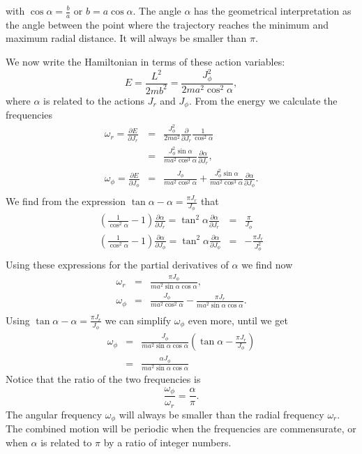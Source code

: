 \documentclass[letterpaper,11pt]{article}
\begin{document}
with $\cos\alpha = \frac{b}{a}$ or $b = a \cos\alpha$.  The angle $\alpha$ has the geometrical interpretation as the angle between the point where the trajectory reaches the minimum and maximum radial distance.  It will always be smaller than $\pi$.

We now write the Hamiltonian in terms of these action variables:
\begin{equation*}
 E = \frac{L^2}{2 m b^2} = \frac{J_\phi^2}{2 m a^2 \cos^2\alpha},
\end{equation*}
where $\alpha$ is related to the actions $J_r$ and $J_\phi$.  From the energy we calculate the frequencies
\begin{eqnarray*}
 \omega_r = \frac{\partial E}{\partial J_r} & = & \frac{J_\phi^2}{2 m a^2} \frac{\partial}{\partial J_r} \frac{1}{\cos^2\alpha} \\
 & = & \frac{J_\phi^2 \sin\alpha}{m a^2 \cos^3\alpha} \frac{\partial \alpha}{\partial J_r}, \\
 \omega_\phi = \frac{\partial E}{\partial J_\phi} & = & \frac{J_\phi}{m a^2 \cos^2\alpha} + \frac{J_\phi^2 \sin\alpha}{m a^2 \cos^3\alpha} \frac{\partial \alpha}{\partial J_\phi}. \\
\end{eqnarray*}
We find from the expression $\tan\alpha - \alpha = \frac{\pi J_r}{J_\phi}$ that
\begin{eqnarray*}
 \left( \frac{1}{\cos^2\alpha} - 1 \right) \frac{\partial \alpha}{\partial J_r} = \tan^2\alpha \frac{\partial \alpha}{\partial J_r} & = & \frac{\pi}{J_\phi} \\
 \left( \frac{1}{\cos^2\alpha} - 1 \right) \frac{\partial \alpha}{\partial J_\phi} = \tan^2\alpha \frac{\partial \alpha}{\partial J_\phi} & = & -\frac{\pi J_r}{J_\phi^2} \\
\end{eqnarray*}
Using these expressions for the partial derivatives of $\alpha$ we find now
\begin{eqnarray*}
 \omega_r & = & \frac{\pi J_\phi}{m a^2 \sin\alpha \cos\alpha}, \\
 \omega_\phi & = & \frac{J_\phi}{m a^2 \cos^2\alpha} - \frac{\pi J_r}{m a^2 \sin\alpha \cos\alpha}. \\
\end{eqnarray*}
Using $\tan\alpha - \alpha = \frac{\pi J_r}{J_\phi}$ we can simplify $\omega_\phi$ even more, until we get
\begin{eqnarray*}
 \omega_\phi & = & \frac{J_\phi}{m a^2 \sin\alpha \cos\alpha} \left( \tan\alpha - \frac{\pi J_r}{J_\phi} \right) \\
 & = & \frac{\alpha J_\phi}{m a^2 \sin\alpha \cos\alpha}
\end{eqnarray*}
Notice that the ratio of the two frequencies is
\begin{equation*}
 \frac{\omega_\phi}{\omega_r} = \frac{\alpha}{\pi}.
\end{equation*}
The angular frequency $\omega_\phi$ will always be smaller than the radial frequency $\omega_r$.  The combined motion will be periodic when the frequencies are commensurate, or when $\alpha$ is related to $\pi$ by a ratio of integer numbers.
\end{document}
